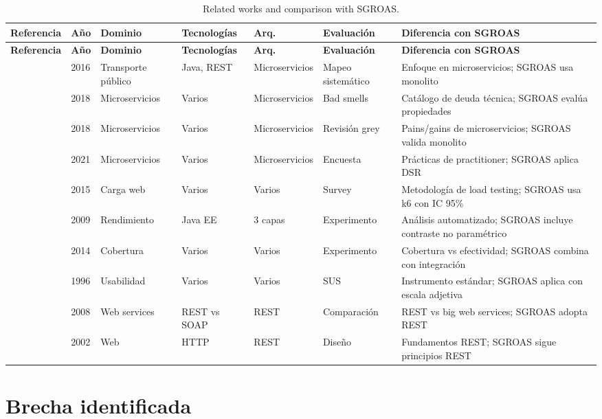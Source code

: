 \begin{longtable}{@{}p{2.2cm}p{1cm}p{1.8cm}p{1.8cm}p{1.5cm}p{1.5cm}p{2cm}@{}}
\caption{Related works and comparison with SGROAS.}
\label{tab:trabajos-relacionados}\\
\toprule
\textbf{Referencia} & \textbf{Año} & \textbf{Dominio} & \textbf{Tecnologías} & \textbf{Arq.} & \textbf{Evaluación} & \textbf{Diferencia con SGROAS} \\
\midrule
\endfirsthead
\toprule
\textbf{Referencia} & \textbf{Año} & \textbf{Dominio} & \textbf{Tecnologías} & \textbf{Arq.} & \textbf{Evaluación} & \textbf{Diferencia con SGROAS} \\
\midrule
\endhead
\cite{alshuqayran2016} & 2016 & Transporte público & Java, REST & Microservicios & Mapeo sistemático & Enfoque en microservicios; SGROAS usa monolito \\ \midrule
\cite{taibi2018} & 2018 & Microservicios & Varios & Microservicios & Bad smells & Catálogo de deuda técnica; SGROAS evalúa propiedades \\ \midrule
\cite{soldani2018} & 2018 & Microservicios & Varios & Microservicios & Revisión grey & Pains/gains de microservicios; SGROAS valida monolito \\ \midrule
\cite{waseem2021} & 2021 & Microservicios & Varios & Microservicios & Encuesta & Prácticas de practitioner; SGROAS aplica DSR \\ \midrule
\cite{jiang2015} & 2015 & Carga web & Varios & Varios & Survey & Metodología de load testing; SGROAS usa k6 con IC 95\% \\ \midrule
\cite{jiang2009} & 2009 & Rendimiento & Java EE & 3 capas & Experimento & Análisis automatizado; SGROAS incluye contraste no paramétrico \\ \midrule
\cite{inozemtseva2014} & 2014 & Cobertura & Varios & Varios & Experimento & Cobertura vs efectividad; SGROAS combina con integración \\ \midrule
\cite{brooke1996} & 1996 & Usabilidad & Varios & Varios & SUS & Instrumento estándar; SGROAS aplica con escala adjetiva \\ \midrule
\cite{pautasso2008} & 2008 & Web services & REST vs SOAP & REST & Comparación & REST vs big web services; SGROAS adopta REST \\ \midrule
\cite{fielding2002} & 2002 & Web & HTTP & REST & Diseño & Fundamentos REST; SGROAS sigue principios REST \\
\bottomrule
\end{longtable}

\section{Brecha identificada}
\label{sec:brecha}

